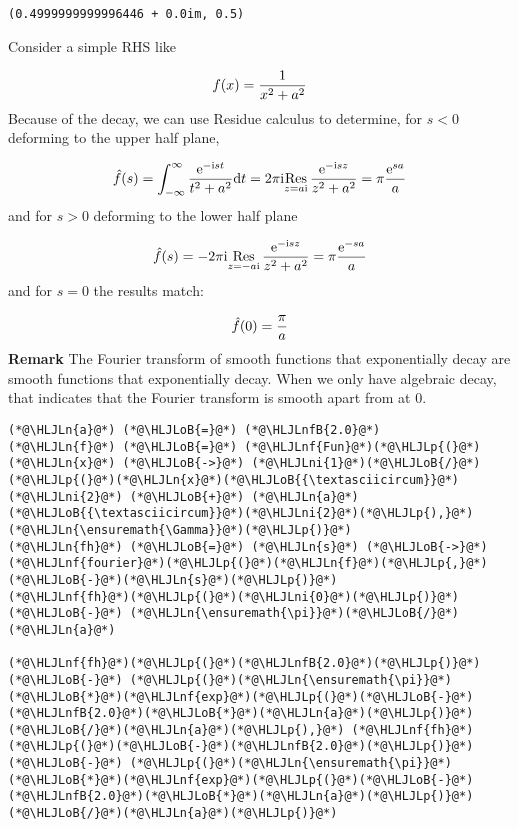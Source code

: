 \documentclass[12pt,landscape]{article}
\newcommand{\HLJLn}[1]{#1}
\newcommand{\HLJLnf}[1]{\textcolor[RGB]{66,102,213}{#1}}
\newcommand{\HLJLnfB}[1]{\textcolor[RGB]{59,151,46}{#1}}
\newcommand{\HLJLni}[1]{\textcolor[RGB]{59,151,46}{#1}}
\newcommand{\HLJLoB}[1]{\textcolor[RGB]{102,102,102}{\textbf{#1}}}
\newcommand{\HLJLp}[1]{#1}
\def\D{ {\rm d} }
\def\I{ {\rm i} }
\def\E{ {\rm e} }
\def\Res_#1{\underset{#1}{\rm Res}\,}
\def\dt{\D t}
\begin{document}
{\begin{lstlisting}
(0.4999999999996446 + 0.0im, 0.5)
\end{lstlisting}


Consider a simple RHS like

\[
f(x) = {1 \over x^2 + a^2}
\]
Because of the decay, we can use Residue calculus to determine, for $s < 0$ deforming to the upper half plane,

\[
\hat f(s) = \int_{-\infty}^\infty {\E^{-\I s t} \over t^2 + a^2}\dt = 2 \pi \I \Res_{z = a \I}{\E^{-\I s z} \over z^2 + a^2} = \pi  {\E^{s a} \over a}
\]
and for $s > 0$ deforming to the lower half plane

\[
\hat f(s) =-2 \pi \I \Res_{z =- a \I}{\E^{-\I s z} \over z^2 + a^2} = \pi {\E^{-s a} \over  a}
\]
and for $s = 0$ the results match:

\[
\hat f(0) = {\pi  \over  a}
\]
\textbf{Remark} The Fourier transform of smooth functions that exponentially decay are smooth functions that exponentially decay. When we only have algebraic decay, that indicates that the Fourier transform is smooth apart from at $0$.


\begin{lstlisting}
(*@\HLJLn{a}@*) (*@\HLJLoB{=}@*) (*@\HLJLnfB{2.0}@*)
(*@\HLJLn{f}@*) (*@\HLJLoB{=}@*) (*@\HLJLnf{Fun}@*)(*@\HLJLp{(}@*)(*@\HLJLn{x}@*) (*@\HLJLoB{->}@*) (*@\HLJLni{1}@*)(*@\HLJLoB{/}@*)(*@\HLJLp{(}@*)(*@\HLJLn{x}@*)(*@\HLJLoB{{\textasciicircum}}@*)(*@\HLJLni{2}@*) (*@\HLJLoB{+}@*) (*@\HLJLn{a}@*)(*@\HLJLoB{{\textasciicircum}}@*)(*@\HLJLni{2}@*)(*@\HLJLp{),}@*) (*@\HLJLn{\ensuremath{\Gamma}}@*)(*@\HLJLp{)}@*)
(*@\HLJLn{fh}@*) (*@\HLJLoB{=}@*) (*@\HLJLn{s}@*) (*@\HLJLoB{->}@*) (*@\HLJLnf{fourier}@*)(*@\HLJLp{(}@*)(*@\HLJLn{f}@*)(*@\HLJLp{,}@*) (*@\HLJLoB{-}@*)(*@\HLJLn{s}@*)(*@\HLJLp{)}@*)
(*@\HLJLnf{fh}@*)(*@\HLJLp{(}@*)(*@\HLJLni{0}@*)(*@\HLJLp{)}@*) (*@\HLJLoB{-}@*) (*@\HLJLn{\ensuremath{\pi}}@*)(*@\HLJLoB{/}@*)(*@\HLJLn{a}@*)

(*@\HLJLnf{fh}@*)(*@\HLJLp{(}@*)(*@\HLJLnfB{2.0}@*)(*@\HLJLp{)}@*) (*@\HLJLoB{-}@*) (*@\HLJLp{(}@*)(*@\HLJLn{\ensuremath{\pi}}@*)(*@\HLJLoB{*}@*)(*@\HLJLnf{exp}@*)(*@\HLJLp{(}@*)(*@\HLJLoB{-}@*)(*@\HLJLnfB{2.0}@*)(*@\HLJLoB{*}@*)(*@\HLJLn{a}@*)(*@\HLJLp{)}@*)(*@\HLJLoB{/}@*)(*@\HLJLn{a}@*)(*@\HLJLp{),}@*) (*@\HLJLnf{fh}@*)(*@\HLJLp{(}@*)(*@\HLJLoB{-}@*)(*@\HLJLnfB{2.0}@*)(*@\HLJLp{)}@*) (*@\HLJLoB{-}@*) (*@\HLJLp{(}@*)(*@\HLJLn{\ensuremath{\pi}}@*)(*@\HLJLoB{*}@*)(*@\HLJLnf{exp}@*)(*@\HLJLp{(}@*)(*@\HLJLoB{-}@*)(*@\HLJLnfB{2.0}@*)(*@\HLJLoB{*}@*)(*@\HLJLn{a}@*)(*@\HLJLp{)}@*)(*@\HLJLoB{/}@*)(*@\HLJLn{a}@*)(*@\HLJLp{)}@*)
\end{lstlisting}

}
\end{document}
